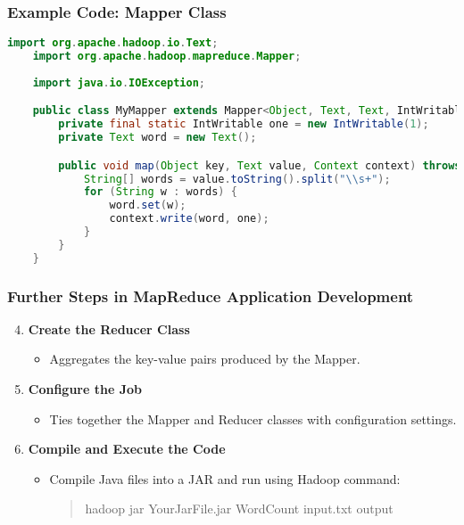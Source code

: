 \documentclass[aspectratio=169]{beamer}
\begin{document}
\begin{frame}[fragile]
    \frametitle{Example Code: Mapper Class}
    \begin{lstlisting}[language=java]
    import org.apache.hadoop.io.Text;
    import org.apache.hadoop.mapreduce.Mapper;
    
    import java.io.IOException;

    public class MyMapper extends Mapper<Object, Text, Text, IntWritable> {
        private final static IntWritable one = new IntWritable(1);
        private Text word = new Text();

        public void map(Object key, Text value, Context context) throws IOException, InterruptedException {
            String[] words = value.toString().split("\\s+");
            for (String w : words) {
                word.set(w);
                context.write(word, one);
            }
        }
    }
    \end{lstlisting}
\end{frame}

\begin{frame}[fragile]
    \frametitle{Further Steps in MapReduce Application Development}
    \begin{enumerate}
        \setcounter{enumi}{3}
        \item \textbf{Create the Reducer Class}
            \begin{itemize}
                \item Aggregates the key-value pairs produced by the Mapper.
            \end{itemize}

        \item \textbf{Configure the Job}
            \begin{itemize}
                \item Ties together the Mapper and Reducer classes with configuration settings.
            \end{itemize}

        \item \textbf{Compile and Execute the Code}
            \begin{itemize}
                \item Compile Java files into a JAR and run using Hadoop command:
                \begin{quote}
                    hadoop jar YourJarFile.jar WordCount input.txt output
                \end{quote}
            \end{itemize}
    \end{enumerate}
\end{frame}
\end{document}
